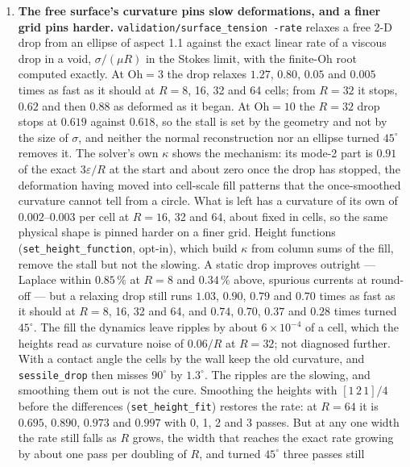 \documentclass[11pt,a4paper]{article}
\newcommand{\code}[1]{\texttt{\small #1}}
\begin{document}
\begin{enumerate}[leftmargin=1.4em,itemsep=4pt]
  free drop in the next item. Any free-surface deflection of a cell or two should
  be quoted with it.
\item \textbf{The free surface's curvature pins slow deformations, and a finer
  grid pins harder.} \code{validation/surface\_tension -rate} relaxes a free
  2-D drop from an ellipse of aspect 1.1 against the exact linear rate of a
  viscous drop in a void, $\sigma/(\mu R)$ in the Stokes limit, with the
  finite-$\mathrm{Oh}$ root computed exactly. At $\mathrm{Oh}=3$ the drop
  relaxes $1.27$, $0.80$, $0.05$ and $0.005$ times as fast as it should at
  $R=8$, 16, 32 and 64 cells; from $R=32$ it stops, $0.62$ and then $0.88$ as
  deformed as it began. At $\mathrm{Oh}=10$ the $R=32$ drop stops at $0.619$
  against $0.618$, so the stall is set by the geometry and not by the size of
  $\sigma$, and neither the normal reconstruction nor an ellipse turned
  $45^\circ$ removes it. The solver's own $\kappa$ shows the mechanism: its
  mode-2 part is $0.91$ of the exact $3\varepsilon/R$ at the start and about zero
  once the drop has stopped, the deformation having moved into cell-scale fill
  patterns that the once-smoothed curvature cannot tell from a circle. What is
  left has a curvature of its own of $0.002$--$0.003$ per cell at $R=16$, 32
  and 64, about fixed in cells, so the same physical shape is pinned harder on a
  finer grid. Height functions (\code{set\_height\_function}, opt-in), which
  build $\kappa$ from column sums of the fill, remove the stall but not the
  slowing. A static drop improves outright --- Laplace within $0.85\,\%$ at
  $R=8$ and $0.34\,\%$ above, spurious currents at round-off --- but a relaxing
  drop still runs $1.03$, $0.90$, $0.79$ and $0.70$ times as fast as it should
  at $R=8$, 16, 32 and 64, and $0.74$, $0.70$, $0.37$ and $0.28$ times turned
  $45^\circ$. The fill the dynamics leave ripples by about $6\times10^{-4}$ of a
  cell, which the heights read as curvature noise of $0.06/R$ at $R=32$; not
  diagnosed further. With a contact angle the cells by the wall keep the old
  curvature, and \code{sessile\_drop} then misses $90^\circ$ by $1.3^\circ$.
  The ripples are the slowing, and smoothing them out is not the cure.
  Smoothing the heights with $[1\,2\,1]/4$ before the differences
  (\code{set\_height\_fit}) restores the rate: at $R=64$ it is $0.695$, $0.890$,
  $0.973$ and $0.997$ with 0, 1, 2 and 3 passes. But at any one width the rate
  still falls as $R$ grows, the width that reaches the exact rate growing by
  about one pass per doubling of $R$, and turned $45^\circ$ three passes still

\end{enumerate}
\end{document}
